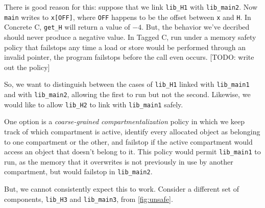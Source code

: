 \documentclass{article}
\begin{document}
There is good reason for this: suppose that we link {\tt lib\_H1} with {\tt lib\_main2}.
Now {\tt main} writes to {\tt x[OFF]}, where {\tt OFF} happens to be the offset between
{\tt x} and {\tt H}. In Concrete C, {\tt get\_H} will return a value of \(-4\).
But, the behavior we've decribed should never produce a negative value.
In Tagged C, run under a memory safety policy that failstops any time a load or store would
be performed through an invalid pointer, the program failstops before the call even occurs.
[TODO: write out the policy]

So, we want to distinguish between the cases of {\tt lib\_H1} linked with {\tt lib\_main1}
and with {\tt lib\_main2}, allowing the first to run but not the second. Likewise,
we would like to allow {\tt lib\_H2} to link with {\tt lib\_main1} safely.

One option is a {\em coarse-grained compartmentalization} policy in which we keep
track of which compartment is active, identify every allocated object as belonging
to one compartment or the other, and failstop if the active compartment would access
an object that doesn't belong to it. This policy would permit {\tt lib\_main1}
to run, as the memory that it overwrites is not previously in use by another compartment,
but would failstop in {\tt lib\_main2}.

But, we cannot consistently expect this to work. Consider a different set of
components, {\tt lib\_H3} and {\tt lib\_main3}, from \cref{fig:unsafe}.
\end{document}
